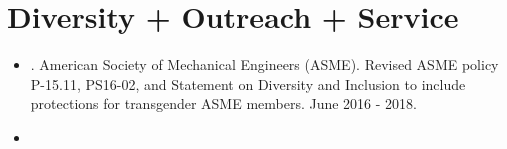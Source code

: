 \documentclass[letterpaper]{deedy-resume} %
\begin{document}
{%
%
%
%
%


\section{Diversity + Outreach + Service}

\vspace{0.2cm}


\begin{itemize}

\item {.} American Society of Mechanical Engineers (ASME). Revised ASME policy P-15.11, PS16-02, and Statement on Diversity and Inclusion to include protections for transgender ASME members. June 2016 - 2018.

\item {} 


\end{itemize}}
\end{document}

